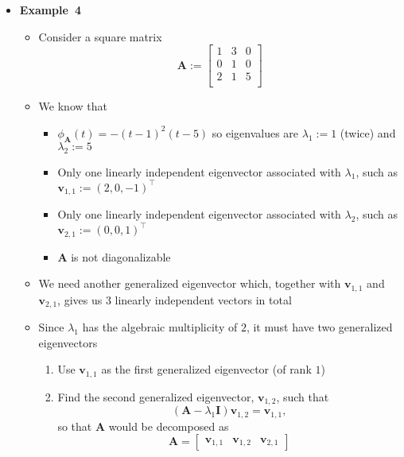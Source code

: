 \documentclass[12pt,a4paper]{article}
\begin{document}
\begin{itemize}

\item \textbf{Example~4}
  \begin{itemize}
  \item Consider a square matrix
    \begin{equation}\nonumber%
      \bm{A} :=
      \begin{bmatrix}
        1 & 3 & 0 \\
        0 & 1 & 0 \\
        2 & 1 & 5 \\
      \end{bmatrix}
    \end{equation}
  \item We know that
    \begin{itemize}
    \item $\phi_{\bm{A}}(t) = -(t-1)^{2}(t-5)$ so eigenvalues are $\lambda_{1}:=1$ (twice) and $\lambda_{2}:=5$
    \item Only one linearly independent eigenvector associated with $\lambda_{1}$, such as $\bm{v}_{1,1}:=(2, 0, -1)^{\top}$
    \item Only one linearly independent eigenvector associated with $\lambda_{2}$, such as $\bm{v}_{2,1}:=(0, 0, 1)^{\top}$
    \item $\bm{A}$ is not diagonalizable
    \end{itemize}
  \item We need another generalized eigenvector which, together with $\bm{v}_{1,1}$ and $\bm{v}_{2,1}$,
    gives us 3 linearly independent vectors in total
  \item Since $\lambda_{1}$ has the algebraic multiplicity of $2$,
    it must have two generalized eigenvectors
    \begin{enumerate}
    \item Use $\bm{v}_{1,1}$ as the first generalized eigenvector (of rank $1$)
    \item Find the second generalized eigenvector, $\bm{v}_{1,2}$, such that
      \begin{equation}\nonumber%
        (\bm{A}-\lambda_{1}\bm{I})\bm{v}_{1,2} = \bm{v}_{1,1},
      \end{equation}
      so that $\bm{A}$ would be decomposed as
      \begin{equation}\nonumber%
        \bm{A} =
        \begin{bmatrix}
          \bm{v}_{1,1} & \bm{v}_{1,2} & \bm{v}_{2,1}

\end{bmatrix}
\end{equation}
\end{enumerate}
\end{itemize}
\end{itemize}
\end{document}
